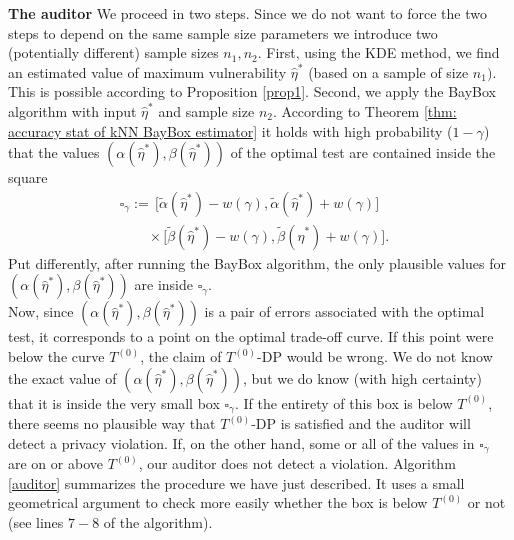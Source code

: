\noindent\textbf{The auditor} We proceed in two steps. Since we do not want to force the two steps to depend on the same sample size parameters we introduce two (potentially different) sample sizes $n_1, n_2$. First, using the KDE method, we find an estimated value of maximum vulnerability $\hat \eta^*$ (based on a sample of size $n_1)$. This is possible according to  Proposition \ref{prop1}. Second, we apply the BayBox algorithm with input $\hat \eta^*$ and sample size $n_2$.  According to Theorem \ref{thm: accuracy stat of kNN BayBox estimator} it holds with high probability ($1-\gamma$) that the values $(\alpha(\hat \eta^*), \beta(\hat \eta^*))$ of the optimal test are contained inside the square
\begin{align} \label{e:defsq}
\square_\gamma:= \,\big[\tilde{\alpha}(\hat \eta^*) - w(\gamma),\tilde{\alpha}(\hat \eta^*) + w(\gamma)\big] &\\
\qquad\times  \big[\tilde{\beta}(\hat \eta^*) - w(\gamma),\tilde{\beta}(\hat \eta^*) + w(\gamma)\big]. \nonumber & 
\end{align}
Put differently, after running the BayBox algorithm, the only plausible values for $(\alpha(\hat \eta^*), \beta(\hat \eta^*))$ are inside $\square_\gamma$. \\
Now, since $(\alpha(\hat \eta^*), \beta(\hat \eta^*))$ is a pair of errors associated with the optimal test, it corresponds to a point on the optimal trade-off curve. If this point were below the curve $T^{(0)}$, the claim of $T^{(0)}$-DP would be wrong. We do not know the exact value of $(\alpha(\hat \eta^*), \beta(\hat \eta^*))$, but we do know (with high certainty) that it is inside the very small box $\square_\gamma$. If the entirety of this box is below $T^{(0)}$, there seems no plausible way that  $T^{(0)}$-DP is satisfied and the auditor will detect a privacy violation. If, on the other hand, some or all of the values in $\square_\gamma$ are on or above  $T^{(0)}$, our %
auditor does not detect a violation. Algorithm \ref{auditor} summarizes the procedure we have just described. It uses a small geometrical argument to check more easily whether the box is below $T^{(0)}$ or not (see lines $7-8$ of the algorithm).

